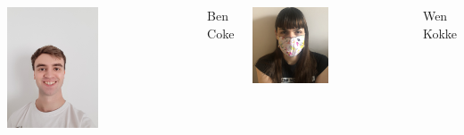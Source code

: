 \documentclass[t,compress,aspectratio=169]{beamer}
\begin{document}
\begin{frame}
\begin{columns}
       \centering
\vspace{-5em}
         \includegraphics[width=0.5\textwidth]{img/Ben.jpg}
           \vspace{4em}
   \begin{block}{\centering\footnotesize{Ben Coke}}
       \end{block}

    \includegraphics[width=0.5\textwidth]{img/Wen.png}
      \begin{alertblock}{\centering \footnotesize{Wen Kokke}}
   \end{alertblock}


\end{columns}
\end{frame}
\end{document}
